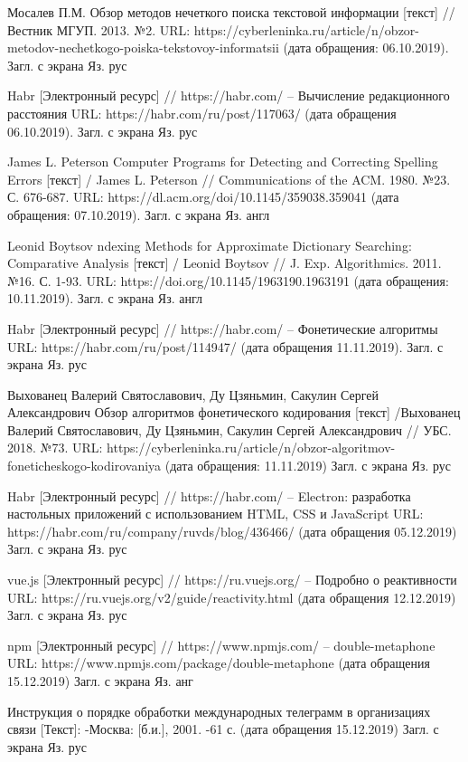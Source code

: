 \begin{thebibliography}{}

 Мосалев П.М. Обзор методов нечеткого поиска текстовой информации [текст] // Вестник МГУП. 2013. №2. URL: https://cyberleninka.ru/article/n/obzor-metodov-nechetkogo-poiska-tekstovoy-informatsii (дата обращения: 06.10.2019). Загл. с экрана Яз. рус

 Habr [Электронный ресурс] // https://habr.com/ -- Вычисление редакционного расстояния URL:
https://habr.com/ru/post/117063/ (дата обращения 06.10.2019). Загл. с экрана Яз. рус

 James L. Peterson Computer Programs for Detecting and Correcting Spelling Errors [текст] / James L. Peterson // Communications of the ACM. 1980. №23. С. 676-687. URL: https://dl.acm.org/doi/10.1145/359038.359041 (дата обращения: 07.10.2019). Загл. с экрана Яз. англ

 Leonid Boytsov ndexing Methods for Approximate Dictionary Searching: Comparative Analysis [текст] / Leonid Boytsov // J. Exp. Algorithmics. 2011. №16. С. 1-93. URL: https://doi.org/10.1145/1963190.1963191 (дата обращения: 10.11.2019). Загл. с экрана Яз. англ

 Habr [Электронный ресурс] // https://habr.com/ -- Фонетические алгоритмы URL: https://habr.com/ru/post/114947/ (дата обращения 11.11.2019). Загл. с экрана Яз. рус

 Выхованец Валерий Святославович, Ду Цзяньмин, Сакулин Сергей Александрович Обзор алгоритмов фонетического кодирования [текст] /Выхованец Валерий Святославович, Ду Цзяньмин, Сакулин Сергей Александрович // УБС. 2018. №73. URL: https://cyberleninka.ru/article/n/obzor-algoritmov-foneticheskogo-kodirovaniya (дата обращения: 11.11.2019) Загл. с экрана Яз. рус

 Habr [Электронный ресурс] // https://habr.com/ -- Electron: разработка настольных приложений с использованием HTML, CSS и JavaScript URL: https://habr.com/ru/company/ruvds/blog/436466/ (дата обращения 05.12.2019) Загл. с экрана Яз. рус

 vue.js [Электронный ресурс] // https://ru.vuejs.org/ -- Подробно о реактивности URL: https://ru.vuejs.org/v2/guide/reactivity.html (дата обращения 12.12.2019) Загл. с экрана Яз. рус

 npm [Электронный ресурс] // https://www.npmjs.com/ -- double-metaphone URL: https://www.npmjs.com/package/double-metaphone (дата обращения 15.12.2019) Загл. с экрана Яз. анг

 Инструкция о порядке обработки международных телеграмм в организациях связи [Текст]: -Москва: [б.и.], 2001. -61 с. (дата обращения 15.12.2019) Загл. с экрана Яз. рус
\end{thebibliography}
